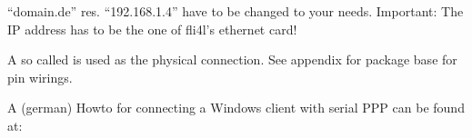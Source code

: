 \begin{description}
        ``domain.de'' res. ``192.168.1.4'' have to be changed to your needs. 
        Important: The IP address has to be the one of fli4l's ethernet card!

        
        A so called  is used as the physical connection. 
        See appendix for package base for pin wirings.
        
        A (german) Howto for connecting a Windows client with serial PPP can be found at:
        


\end{description}
